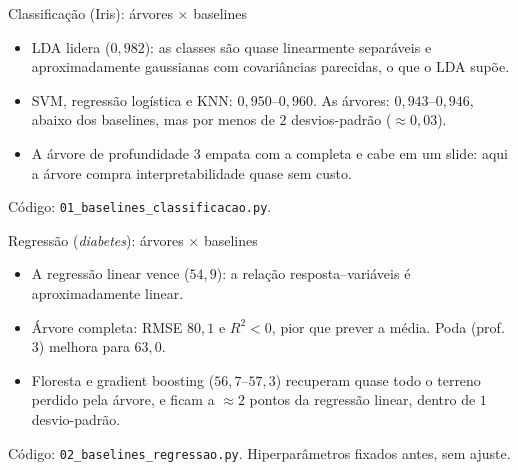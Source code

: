 \begin{frame}[fragile]{Classificação (Iris): árvores $\times$ baselines}
\centering\small


\vspace{4pt}
\raggedright
\begin{itemize}
  \item \alert{LDA lidera} ($0{,}982$): as classes são quase \alert{linearmente separáveis} e aproximadamente gaussianas com covariâncias parecidas, o que o LDA supõe.
  \item SVM, regressão logística e KNN: $0{,}950$--$0{,}960$. As árvores: $0{,}943$--$0{,}946$, \alert{abaixo} dos baselines, mas por menos de $2$ desvios-padrão ($\approx0{,}03$).
  \item A árvore de profundidade $3$ empata com a completa e cabe em um slide: aqui a árvore compra \alert{interpretabilidade} quase sem custo.
\end{itemize}
{\scriptsize Código: \texttt{01\_baselines\_classificacao.py}.}
\end{frame}

\begin{frame}{Regressão (\emph{diabetes}): árvores $\times$ baselines}
\centering\small


\vspace{4pt}
\raggedright
\begin{itemize}
  \item A \alert{regressão linear} vence ($54{,}9$): a relação resposta--variáveis é aproximadamente linear.
  \item \alert{Árvore completa}: RMSE $80{,}1$ e $R^2<0$, \alert{pior que prever a média}. Poda (prof.\ $3$) melhora para $63{,}0$.
  \item Floresta e gradient boosting ($56{,}7$--$57{,}3$) recuperam quase todo o terreno perdido pela árvore, e ficam a $\approx2$ pontos da regressão linear, dentro de $1$ desvio-padrão.
\end{itemize}
{\scriptsize Código: \texttt{02\_baselines\_regressao.py}. Hiperparâmetros fixados antes, sem ajuste.}
\end{frame}

